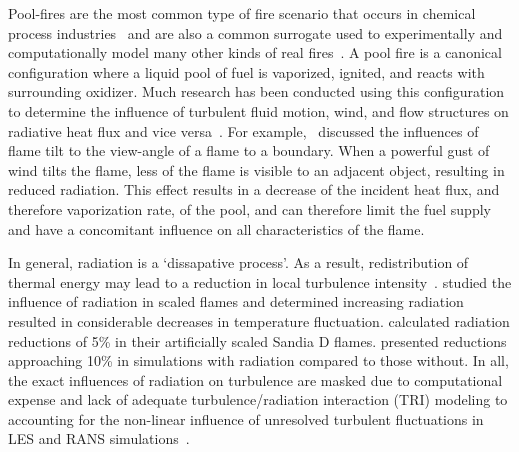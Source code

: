 Pool-fires are the most common type of fire scenario that occurs in chemical process industries~\cite{Miao2014AccidentDike} and are also a common surrogate used to experimentally and computationally model many other kinds of real fires~\cite{Chen2023PoolAdvances}. A pool fire is a canonical configuration where a liquid pool of fuel is vaporized, ignited, and reacts with surrounding oxidizer. Much research has been conducted using this configuration to determine the influence of turbulent fluid motion, wind, and flow structures on radiative heat flux and vice versa~\cite{Chen2023PoolAdvances}.
For example,~\citet{Hu2017AChallenges} discussed the influences of flame tilt to the view-angle of a flame to a boundary. When a powerful gust of wind tilts the flame, less of the flame is visible to an adjacent object, resulting in reduced radiation. This effect results in a decrease of the incident heat flux, and therefore vaporization rate, of the pool, and can therefore limit the fuel supply and have a concomitant influence on all characteristics of the flame.

In general, radiation is a `dissapative process'. As a result, redistribution of thermal energy may lead to a reduction in local turbulence intensity~\cite{Modest2016RadiativeSystems}. \citet{Li2002InvestigationMethod.} studied the influence of radiation in scaled flames and determined increasing radiation resulted in considerable decreases in temperature fluctuation. \citet{Wang2008MonteFlames} calculated radiation reductions of 5\% in their artificially scaled Sandia D flames. \citet{Consalvi2012InfluenceFires} presented reductions approaching 10\% in simulations with radiation compared to those without. In all, the exact influences of radiation on turbulence are masked due to computational expense and lack of adequate turbulence/radiation interaction (TRI) modeling to accounting for the non-linear influence of unresolved turbulent fluctuations in LES and RANS simulations~\cite{Modest2016RadiativeSystems}.



